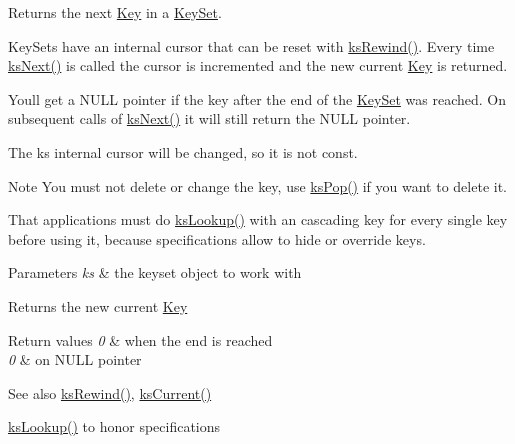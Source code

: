 Returns the next \mbox{\hyperlink{classkdb_1_1Key}{Key}} in a \mbox{\hyperlink{classkdb_1_1KeySet}{Key\+Set}}. 

Key\+Sets have an internal cursor that can be reset with \mbox{\hyperlink{group__keyset_gabe793ff51f1728e3429c84a8a9086b70}{ks\+Rewind()}}. Every time \mbox{\hyperlink{group__keyset_ga317321c9065b5a4b3e33fe1c399bcec9}{ks\+Next()}} is called the cursor is incremented and the new current \mbox{\hyperlink{classkdb_1_1Key}{Key}} is returned.

You\textquotesingle{}ll get a N\+U\+LL pointer if the key after the end of the \mbox{\hyperlink{classkdb_1_1KeySet}{Key\+Set}} was reached. On subsequent calls of \mbox{\hyperlink{group__keyset_ga317321c9065b5a4b3e33fe1c399bcec9}{ks\+Next()}} it will still return the N\+U\+LL pointer.

The {\ttfamily ks} internal cursor will be changed, so it is not const.

\begin{DoxyNote}{Note}
You must not delete or change the key, use \mbox{\hyperlink{group__keyset_gae42530b04defb772059de0600159cf69}{ks\+Pop()}} if you want to delete it.

That applications must do \mbox{\hyperlink{group__keyset_gaa34fc43a081e6b01e4120daa6c112004}{ks\+Lookup()}} with an cascading key for every single key before using it, because specifications allow to hide or override keys.
\end{DoxyNote}

\begin{DoxyParams}{Parameters}
{\em ks} & the keyset object to work with \\
\hline
\end{DoxyParams}
\begin{DoxyReturn}{Returns}
the new current \mbox{\hyperlink{classkdb_1_1Key}{Key}} 
\end{DoxyReturn}

\begin{DoxyRetVals}{Return values}
{\em 0} & when the end is reached \\
\hline
{\em 0} & on N\+U\+LL pointer \\
\hline
\end{DoxyRetVals}
\begin{DoxySeeAlso}{See also}
\mbox{\hyperlink{group__keyset_gabe793ff51f1728e3429c84a8a9086b70}{ks\+Rewind()}}, \mbox{\hyperlink{group__keyset_ga4287b9416912c5f2ab9c195cb74fb094}{ks\+Current()}} 

\mbox{\hyperlink{group__keyset_gaa34fc43a081e6b01e4120daa6c112004}{ks\+Lookup()}} to honor specifications 
\end{DoxySeeAlso}
\mbox{\label{classkdb_1_1KeySet_a1c54736b7206bc2253d02a5bf4b3ccfb}} 
